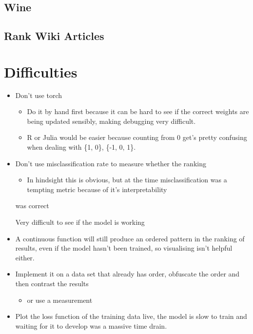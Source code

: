 \documentclass[a4paper,11pt,twoside]{article}
\begin{document}
\subsection{Wine}
\label{sec:org7a10a93}
\subsection{Rank Wiki Articles}
\label{sec:org5a6ad60}
\section{Difficulties}
\label{sec:orgda7e9db}
\begin{itemize}
\item Don't use torch
\begin{itemize}
\item Do it by hand first because it can be hard to see if the correct
weights are being updated sensibly, making debugging very difficult.
\item R or Julia would be easier because counting from 0 get's pretty
confusing when dealing with \{1, 0\}, \{-1, 0, 1\}.
\end{itemize}
\item Don't use misclassification rate to measure whether the ranking
\begin{itemize}
\item In hindsight this is obvious, but at the time misclassification
was a tempting metric because of it's interpretability
\end{itemize}
was correct

Very difficult to see if the model is working

\item A continuous function will still produce an ordered pattern in
the ranking of results, even if the model hasn't been trained,
so visualising isn't helpful either.

\item Implement it on a data set that already has order, obfuscate the
order and then contrast the results
\begin{itemize}
\item or use a measurement
\end{itemize}

\item Plot the loss function of the training data live, the model is
slow to train and waiting for it to develop was a massive time
drain.
\end{itemize}
\end{document}
